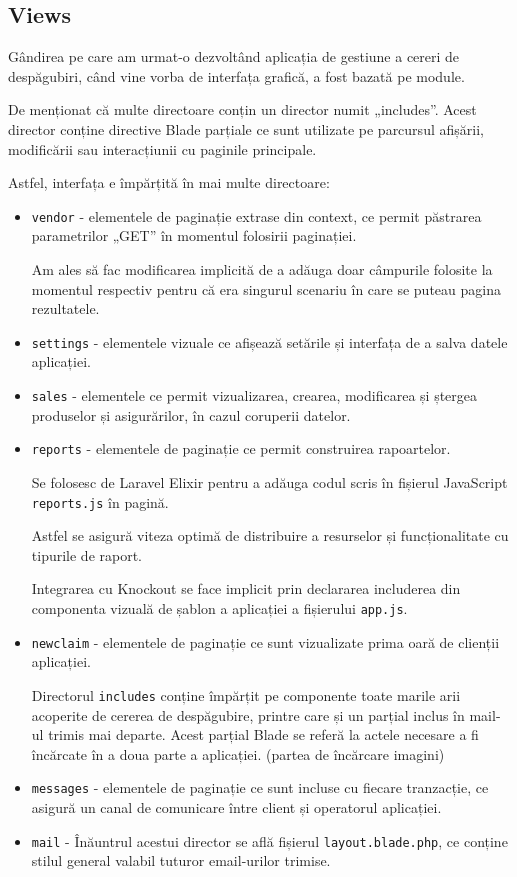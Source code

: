 \subsection{Views}

	Gândirea pe care am urmat-o dezvoltând aplicația de gestiune a cereri de despăgubiri, când vine vorba de interfața grafică, a fost bazată pe module.

	De menționat că multe directoare conțin un director numit „includes”.
	Acest director conține directive Blade parțiale ce sunt utilizate pe parcursul afișării, modificării sau interacțiunii cu paginile principale.

	Astfel, interfața e împărțită în mai multe directoare:

	\begin{itemize}
		\item \verb|vendor| - elementele de paginație extrase din context, ce permit păstrarea parametrilor „GET” în momentul folosirii paginației.

		Am ales să fac modificarea implicită de a adăuga doar câmpurile folosite la momentul respectiv pentru că era singurul scenariu în care se puteau pagina rezultatele.

		\item \verb|settings| - elementele vizuale ce afișează setările și interfața de a salva datele aplicației.
		\item \verb|sales| - elementele ce permit vizualizarea, crearea, modificarea și ștergea produselor și asigurărilor, în cazul coruperii datelor.
		\item \verb|reports| - elementele de paginație ce permit construirea rapoartelor.

		Se folosesc de Laravel Elixir pentru a adăuga codul scris în fișierul JavaScript \verb|reports.js| în pagină.

		Astfel se asigură viteza optimă de distribuire a resurselor și funcționalitate cu tipurile de raport.

		Integrarea cu Knockout se face implicit prin declararea includerea din componenta vizuală de șablon a aplicației a fișierului \verb|app.js|.
		\item \verb|newclaim| - elementele de paginație ce sunt vizualizate prima oară de clienții aplicației.

		Directorul \verb|includes| conține împărțit pe componente toate marile arii acoperite de cererea de despăgubire, printre care și un parțial inclus în mail-ul trimis mai departe.
		Acest parțial Blade se referă la actele necesare a fi încărcate în a doua parte a aplicației. (partea de încărcare imagini)
		\item \verb|messages| - elementele de paginație ce sunt incluse cu fiecare tranzacție, ce asigură un canal de comunicare între client și operatorul aplicației.
		\item \verb|mail| - Înăuntrul acestui director se află fișierul \verb|layout.blade.php|, ce conține stilul general valabil tuturor email-urilor trimise.


\end{itemize}

